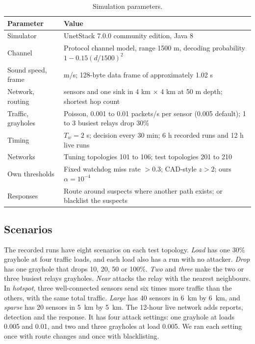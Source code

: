 \documentclass[11pt]{article}
\begin{document}
\begin{table}[htbp]
\centering\small
\caption{Simulation parameters.}\label{tab:params}
\begin{tabular}{>{\raggedright\arraybackslash}p{3.4cm} >{\raggedright\arraybackslash}p{11.4cm}}
\toprule
Parameter & Value \\
\midrule
Simulator & UnetStack 7.0.0 community edition, Java 8 \\
Channel & Protocol channel model, range 1500 m, decoding probability $1-0.15(d/1500)^2$ \\
Sound speed, frame & 1500 m/s; 128-byte data frame of approximately 1.02 s \\
Network, routing & 20 sensors and one sink in 4 km $\times$ 4 km at 50 m depth; shortest hop count \\
Traffic, grayholes & Poisson, 0.001 to 0.01 packets/s per sensor (0.005 default); 1 to 3 busiest relays drop 30\% \\
Timing & $T_w = 2$ s; decision every 30 min; 6 h recorded runs and 12 h live runs \\
Networks & Tuning topologies 101 to 106; test topologies 201 to 210 \\
Own thresholds & Fixed watchdog miss rate $> 0.3$; CAD-style $z > 2$; ours $\alpha = 10^{-4}$ \\
Responses & Route around suspects where another path exists; or blacklist the suspects \\
\bottomrule
\end{tabular}
\end{table}

\subsection{Scenarios}\label{sec:res-scenarios}
\noindent
The recorded runs have eight scenarios on each test topology.
\emph{Load} has one 30\% grayhole at four traffic loads, and each load also has a run with no attacker.
\emph{Drop} has one grayhole that drops 10, 20, 50 or 100\%.
\emph{Two} and \emph{three} make the two or three busiest relays grayholes.
\emph{Near} attacks the relay with the nearest neighbours.
In \emph{hotspot}, three well-connected sensors send six times more traffic than the others, with the same total traffic.
\emph{Large} has 40 sensors in 6~km by 6~km, and \emph{sparse} has 20 sensors in 5~km by 5~km.
The 12-hour live network adds reports, detection and the response.
It has four attack settings: one grayhole at loads 0.005 and 0.01, and two and three grayholes at load 0.005.
We ran each setting once with route changes and once with blacklisting.
\end{document}
